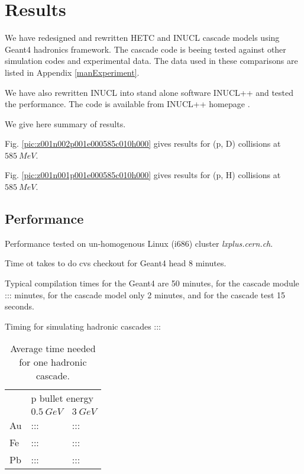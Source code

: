 \section{Results}
\label{results}

We have redesigned and rewritten HETC and INUCL cascade models using {\sc Geant4} hadronics framework. The cascade code is beeing tested against other simulation codes and experimental data.
The data used in these comparisons are listed in Appendix \ref{manExperiment}.


We have also rewritten INUCL into stand alone software INUCL++ and tested the performance. The code is available from INUCL++ homepage \cite{heikkinen02k}.

We give here summary of results. 
  
Fig. \ref{pic:z001n002p001e000585c010h000} gives results for (p, D) collisions at $585~MeV$.

Fig. \ref{pic:z001n001p001e000585c010h000} gives results for (p, H) collisions at $585~MeV$.

\subsection{Performance}

Performance tested on un-homogenous Linux (i686) cluster {\em lxplus.cern.ch}.
 
Time ot takes to do cvs checkout for {\sc Geant4} head 8 minutes.


Typical compilation times for the {\sc Geant4} are 50 minutes, 
for the cascade module  ::: minutes, 
for the cascade model only 2 minutes, 
and for the cascade test 15 seconds.

Timing for simulating hadronic cascades :::

\begin{table}
\begin{center}

\begin{tabular}{|l||l|l||}
\hline
&\multicolumn{2}{l|}{p bullet energy}\\
\cline{2-3}
& $0.5~GeV$ & $3~GeV$ \\
\hline\hline
Au    & ::: & ::: \\
Fe    & ::: & ::: \\
Pb    & ::: & ::: \\
\hline
\end{tabular}
\end{center}
\caption{Average time needed for one hadronic cascade.}
\label{tab:timing}
\end{table}


